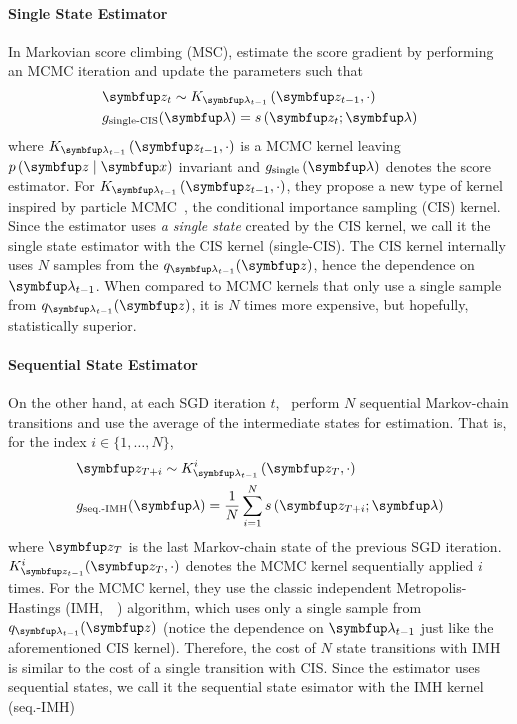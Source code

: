 \vspace{-0.05in}
\paragraph{Single State Estimator}
In Markovian score climbing (MSC), \citeauthor{NEURIPS2020_b2070693} estimate the score gradient by performing an MCMC iteration and update the parameters such that
\vspace{-0.05in}
\begin{align*}
  &\vz_t \sim K_{\vlambda_{t-1}}\left(\vz_{t-1}, \cdot \right) \\
  &g_{\text{single-CIS}}(\vlambda) = s\,(\vz_t; \vlambda)
\end{align*}
where \(K_{\vlambda_{t-1}}\left(\vz_{t-1}, \cdot\right)\) is a MCMC kernel leaving \(p\,(\vz\mid\vx)\) invariant and \(g_{\text{single}}\left(\vlambda\right)\) denotes the score estimator.
For \(K_{\vlambda_{t-1}}\left(\vz_{t-1}, \cdot\right)\), they propose a new type of kernel inspired by particle MCMC~\citep{andrieu_particle_2010, andrieu_uniform_2018}, the conditional importance sampling (CIS) kernel.
Since the estimator uses \textit{a single state} created by the CIS kernel, we call it the single state estimator with the CIS kernel (single-CIS).
The CIS kernel internally uses \(N\) samples from the \(q_{\vlambda_{t-1}}(\vz)\), hence the dependence on \(\vlambda_{t-1}\).
When compared to MCMC kernels that only use a single sample from \(q_{\vlambda_{t-1}}(\vz)\), it is \(N\) times more expensive, but hopefully, statistically superior.

\vspace{-0.05in}
\paragraph{Sequential State Estimator}
On the other hand, at each SGD iteration \(t\),~\citep{pmlr-v124-ou20a} perform \(N\) sequential Markov-chain transitions and use the average of the intermediate states for estimation.
That is, for the index \(i \in \{1, \ldots, N\}\),
\vspace{-0.05in}
\begin{align*}
  &\vz_{T+i} \sim K_{\vlambda_{t-1}}^i\left(\vz_{T}, \cdot \right) \\
  &g_{\text{seq.-IMH}}(\vlambda) = \frac{1}{N} \sum_{i=1}^N s\,(\vz_{T+i}; \vlambda)
\end{align*}
where \(\vz_T\) is the last Markov-chain state of the previous SGD iteration.
\(K^{i}_{\vz_{t-1}}(\vz_{T}, \cdot)\) denotes the MCMC kernel sequentially applied \(i\) times.
For the MCMC kernel, they use the classic independent Metropolis-Hastings (IMH,~\citealt[Algorithm 25]{robert_monte_2004}~\citealt{hastings_monte_1970}) algorithm, which uses only a single sample from \(q_{\vlambda_{t-1}}(\vz)\) (notice the dependence on \(\vlambda_{t-1}\) just like the aforementioned CIS kernel).
Therefore, the cost of \(N\) state transitions with IMH is similar to the cost of a single transition with CIS.
Since the estimator uses sequential states, we call it the sequential state esimator with the IMH kernel (seq.-IMH)

